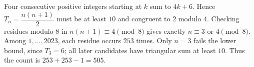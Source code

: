 Four consecutive positive integers starting at $k$ sum to $4k+6$. Hence $T_n=\dfrac{n(n+1)}{2}$ must be at least $10$ and congruent to $2$ modulo $4$. Checking residues modulo $8$ in $n(n+1)\equiv4\pmod8$ gives exactly $n\equiv3$ or $4\pmod8$. Among $1,\ldots,2023$, each residue occurs $253$ times. Only $n=3$ fails the lower bound, since $T_3=6$; all later candidates have triangular sum at least $10$. Thus the count is $253+253-1=\boxed{505}$.
